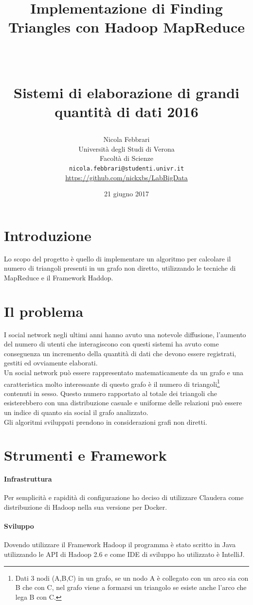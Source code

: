 \documentclass[paper=a4, fontsize=11pt]{scrartcl}	%
\title{ \vspace{-1in} 	\usefont{OT1}{bch}{b}{n}
		\huge \strut Implementazione di Finding Triangles con Hadoop MapReduce\strut \\
		\Large \bfseries \strut Sistemi di elaborazione di grandi quantità di dati 2016 \strut
}
\author{ 									\usefont{OT1}{bch}{m}{n}
        Nicola Febbrari\\		\usefont{OT1}{bch}{m}{n}
        Università degli Studi di Verona\\	\usefont{OT1}{bch}{m}{n}
        Facoltà di Scienze\\
        \texttt{nicola.febbrari@studenti.univr.it}\\
        \href{https://github.com/nickxbs/LabBigData}{https://github.com/nickxbs/LabBigData}
}
\date{21 giugno 2017}
\numberwithin{equation}{section}															%
\numberwithin{figure}{section}																%
\numberwithin{table}{section}																%
\begin{document}
\maketitle
\section{Introduzione}
Lo scopo del progetto è quello di implementare un algoritmo per calcolare il numero di triangoli presenti in un grafo non diretto, utilizzando le tecniche di MapReduce e il Framework Haddop.


\section{Il problema}
I social network negli ultimi anni hanno avuto una notevole diffusione, l'aumento del numero di utenti che interagiscono con questi sistemi ha avuto come conseguenza un  incremento della quantità di dati che devono essere registrati, gestiti ed ovviamente elaborati.\\
Un social network può essere rappresentato matematicamente da un grafo e una caratteristica molto interessante di questo grafo è il numero di triangoli\footnote{Dati 3 nodi (A,B,C) in un grafo, se un nodo A è collegato con un arco sia con B che con C, nel grafo viene a formarsi un triangolo se esiste anche l'arco che lega B con C.} 
contenuti in sesso. Questo numero rapportato al totale dei triangoli che esisterebbero con una distribuzione casuale e uniforme delle relazioni può essere un indice di quanto sia social il grafo analizzato.\\
Gli algoritmi sviluppati prendono in considerazioni grafi non diretti.\\
\section{Strumenti e Framework}
\paragraph{Infrastruttura}
Per semplicità e rapidità di configurazione ho deciso di utilizzare Claudera come distribuzione di Hadoop nella sua versione per Docker.
\paragraph{Sviluppo}
Dovendo utilizzare il Framework Hadoop il programma è stato scritto in Java utilizzando le API di Hadoop 2.6 e come IDE di sviluppo ho utilizzato è IntelliJ.  
\end{document}
